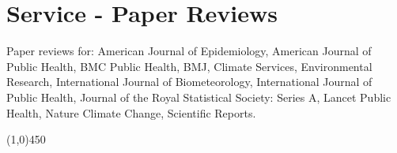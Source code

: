 \section*{Service - Paper Reviews}

\noindent Paper reviews for: American Journal of Epidemiology, American Journal of Public Health, BMC Public Health, BMJ, Climate Services, Environmental Research, International Journal of Biometeorology, International Journal of Public Health, Journal of the Royal Statistical Society: Series A, Lancet Public Health, Nature Climate Change, Scientific Reports.

\begin{center} \line(1,0){450} \end{center}